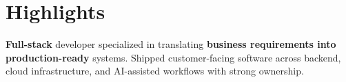 \section{Highlights}

\begin{onecolentry}
    \begin{highlightsforbulletentries}

    \item \textbf{Full-stack} developer specialized in translating \textbf{business requirements into production-ready} systems. Shipped customer-facing software across backend, cloud infrastructure, and AI-assisted workflows with strong ownership.


    \end{highlightsforbulletentries}
\end{onecolentry}